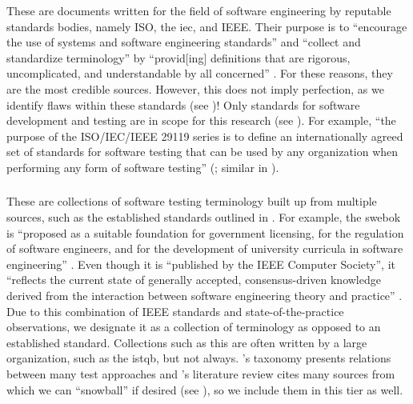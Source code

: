 These are documents written for the field of software engineering by reputable
standards bodies, namely ISO, the \acf{iec}, and IEEE. Their purpose is to
``encourage the use of systems and software engineering standards'' and
``collect and standardize terminology'' by ``provid[ing] definitions that are
rigorous, uncomplicated, and understandable by all concerned''
\citep[p.~viii]{IEEE2017}. For these reasons, they
are the most credible sources. However, this does not imply perfection, as we
identify  %
flaws within these standards (see )!
Only standards for software development and testing are in scope for
this research (see ). For example, ``the purpose of the
ISO/IEC/IEEE 29119 series is to define an internationally agreed set of
standards for software testing that can be used by any organization when
performing any form of software testing''
\ifnotpaper(\fi\citeyear[p.~vii]{IEEE2022}\ifnotpaper; similar in
\citeyear[p.~ix]{IEEE2016})\fi.

\subsubsection{}
\label{metas}

These are collections of software testing terminology built up from multiple
sources, such as the established standards outlined in . For
example, the \acs{swebok} is ``proposed as a
suitable foundation for government licensing, for the regulation of software
engineers, and for the development of university curricula in software
engineering'' \citep[p.~xix]{KanerEtAl2011}. Even though it is ``published by
the IEEE Computer Society'', it ``reflects the current state of generally
accepted, consensus-driven knowledge derived from the interaction between
software engineering theory and practice'' \citep{AboutSWEBOK}. Due to this
combination of IEEE standards and state-of-the-practice observations, we
designate it as a collection of terminology as opposed to an established
standard. Collections such as this are often written by a large
organization, such as the \acf{istqb}, but not always. \ifnotpaper \else
    \citeauthor{Firesmith2015} \fi \citet{Firesmith2015}'s taxonomy presents
relations between many test approaches and \ifnotpaper \else
    \citeauthor{DoğanEtAl2014} \fi \citet{DoğanEtAl2014}'s literature
review cites many sources from which we can ``snowball'' if desired
(see ), so we include them in this tier as well.

